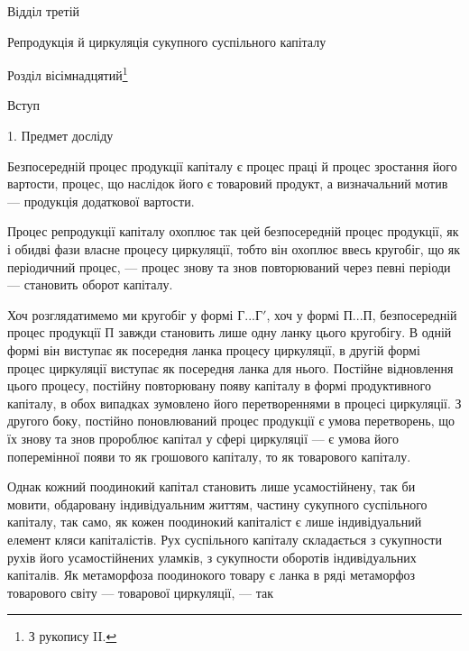 Відділ третій

Репродукція й циркуляція сукупного
суспільного капіталу

Розділ вісімнадцятий\footnote{
З рукопису II.
}

Вступ

1. Предмет досліду

Безпосередній процес продукції капіталу є процес праці й процес
зростання його вартости, процес, що наслідок його є товаровий продукт,
а визначальний мотив — продукція додаткової вартости.

Процес репродукції капіталу охоплює так цей безпосередній процес
продукції, як і обидві фази власне процесу циркуляції, тобто він охоплює
ввесь кругобіг, що як періодичний процес, — процес знову та знов
повторюваний через певні періоди — становить оборот капіталу.

Хоч розглядатимемо ми кругобіг у формі $Г... Г'$, хоч у формі $П... П$,
безпосередній процес продукції П завжди становить лише одну ланку
цього кругобігу. В одній формі він виступає як посередня ланка процесу
циркуляції, в другій формі процес циркуляції виступає як посередня
ланка для нього. Постійне відновлення цього процесу, постійну повторювану
появу капіталу в формі продуктивного капіталу, в обох випадках
зумовлено його перетвореннями в процесі циркуляції. З другого боку,
постійно поновлюваний процес продукції є умова перетворень, що їх
знову та знов пророблює капітал у сфері циркуляції — є умова його
поперемінної появи то як грошового капіталу, то як товарового
капіталу.

Однак кожний поодинокий капітал становить лише усамостійнену, так
би мовити, обдаровану індивідуальним життям, частину сукупного суспільного
капіталу, так само, як кожен поодинокий капіталіст є лише індивідуальний
елемент кляси капіталістів. Рух суспільного капіталу складається
з сукупности рухів його усамостійнених уламків, з сукупности оборотів
індивідуальних капіталів. Як метаморфоза поодинокого товару є ланка
в ряді метаморфоз товарового світу — товарової циркуляції, — так
\parbreak{}  %
